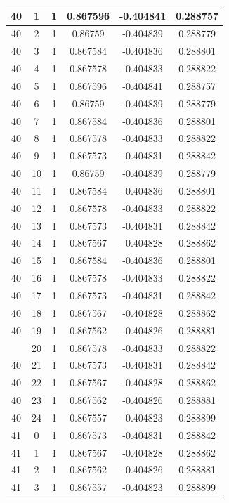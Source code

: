 \documentclass[12pt,a4paper]{article}
\numberwithin{equation}{section}
\numberwithin{figure}{section}
\numberwithin{table}{section}
\begin{document}
\begin{longtable}{|c|c|c|c|c|c|}
40 & 1 & 1 & 0.867596 & -0.404841 & 0.288757 \\ \hline
40 & 2 & 1 & 0.86759 & -0.404839 & 0.288779 \\ \hline
40 & 3 & 1 & 0.867584 & -0.404836 & 0.288801 \\ \hline
40 & 4 & 1 & 0.867578 & -0.404833 & 0.288822 \\ \hline
40 & 5 & 1 & 0.867596 & -0.404841 & 0.288757 \\ \hline
40 & 6 & 1 & 0.86759 & -0.404839 & 0.288779 \\ \hline
40 & 7 & 1 & 0.867584 & -0.404836 & 0.288801 \\ \hline
40 & 8 & 1 & 0.867578 & -0.404833 & 0.288822 \\ \hline
40 & 9 & 1 & 0.867573 & -0.404831 & 0.288842 \\ \hline
40 & 10 & 1 & 0.86759 & -0.404839 & 0.288779 \\ \hline
40 & 11 & 1 & 0.867584 & -0.404836 & 0.288801 \\ \hline
40 & 12 & 1 & 0.867578 & -0.404833 & 0.288822 \\ \hline
40 & 13 & 1 & 0.867573 & -0.404831 & 0.288842 \\ \hline
40 & 14 & 1 & 0.867567 & -0.404828 & 0.288862 \\ \hline
40 & 15 & 1 & 0.867584 & -0.404836 & 0.288801 \\ \hline
40 & 16 & 1 & 0.867578 & -0.404833 & 0.288822 \\ \hline
40 & 17 & 1 & 0.867573 & -0.404831 & 0.288842 \\ \hline
40 & 18 & 1 & 0.867567 & -0.404828 & 0.288862 \\ \hline
40 & 19 & 1 & 0.867562 & -0.404826 & 0.288881 \\ \hline
\pagebreak
40 & 20 & 1 & 0.867578 & -0.404833 & 0.288822 \\ \hline
40 & 21 & 1 & 0.867573 & -0.404831 & 0.288842 \\ \hline
40 & 22 & 1 & 0.867567 & -0.404828 & 0.288862 \\ \hline
40 & 23 & 1 & 0.867562 & -0.404826 & 0.288881 \\ \hline
40 & 24 & 1 & 0.867557 & -0.404823 & 0.288899 \\ \hline
41 & 0 & 1 & 0.867573 & -0.404831 & 0.288842 \\ \hline
41 & 1 & 1 & 0.867567 & -0.404828 & 0.288862 \\ \hline
41 & 2 & 1 & 0.867562 & -0.404826 & 0.288881 \\ \hline
41 & 3 & 1 & 0.867557 & -0.404823 & 0.288899 \\ \hline

\end{longtable}
\end{document}
